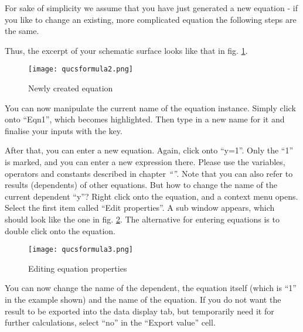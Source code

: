 
For sake of simplicity we assume that you have just generated a new
equation - if you like to change an existing, more complicated equation
the following steps are the same.

Thus, the excerpt of your schematic surface looks like that in fig.
\ref{cap:Newly-created-equation}.

%
\begin{figure}[ht]
\begin{center}\texttt{[image: qucsformula2.png]}\end{center}


\caption{\label{cap:Newly-created-equation}Newly created equation}
\end{figure}


You can now manipulate the current name of the equation
instance. Simply click onto {}``Eqn1'', which becomes
highlighted. Then type in a new name for it and finalise your inputs
with the \Enter key.

After that, you can enter a new equation. Again, click onto {}``y=1''.
Only the {}``1'' is marked, and you can enter a new expression there.
Please use the variables, operators and constants described in chapter
\textit{``''}.  Note that you can also refer to
results (dependents) of other equations.  But how to change the name
of the current dependent {}``y''?  Right click onto the equation, and
a context menu opens.  Select the first item called {}``Edit
properties''.  A sub window appears, which should look like the one in
fig. \ref{cap:Editing-equation-properties}.  The alternative for
entering equations is to double click onto the equation.

%
\begin{figure}
\begin{center}\texttt{[image: qucsformula3.png]}\end{center}


\caption{\label{cap:Editing-equation-properties}Editing equation properties}
\end{figure}


You can now change the name of the dependent, the equation itself
(which is {}``1'' in the example shown) and the name of the equation.
If you do not want the result to be exported into the data display
tab, but temporarily need it for further calculations, select {}``no''
in the {}``Export value'' cell. 


